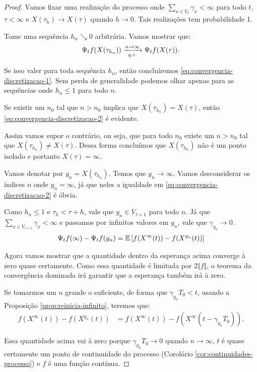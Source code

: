 \begin{proof}
  Vamos fixar uma realização do processo onde $\sum_{x \in V_t}
  \gamma_x < \infty$ para todo $t$, $\tau < \infty$ e $X(\tau_{h}) \to
  X(\tau)$ quando $h \to 0$. Tais realizações tem probabilidade 1.


  Tome uma sequência $h_n \searrow 0$ arbitrária. Vamos mostrar que:
  \begin{equation}
    \label{eq:convergencia-discretizacao-2}
    \Psi_t f (X(\tau_{h_n})) \xrightarrow[{\emph{q.c.}}]{n \to \infty}
    \Psi_t f(X(\tau)).
  \end{equation}

  Se isso valer para toda sequência $h_n$, então concluíremos
  \ref{eq:convergencia-discretizacao-1}. Sem perda de generalidade
  podemos olhar apenas para as sequências onde $h_n \leq 1$ para todo
  $n$.

  Se existir um $n_0$ tal que $n > n_0$ implica que $X(\tau_{h_n}) =
  X(\tau)$, então \eqref{eq:convergencia-discretizacao-2} é evidente.

  Assim vamos supor o contrário, ou seja, que para todo $n_0$ existe
  um $n > n_0$ tal que $X(\tau_{h_n}) \neq X(\tau)$. Dessa forma
  concluímos que $X(\tau_{h_n})$ não é um ponto isolado e portanto
  $X(\tau) = \infty$.

  Vamos denotar por $y_n = X(\tau_{h_n})$. Temos que $y_n \to
  \infty$. Vamos desconsiderar os índices $n$ onde $y_n = \infty$, já
  que neles a igualdade em \eqref{eq:convergencia-discretizacao-2} é
  óbvia.

  Como $h_n \leq 1$ e $\tau_h < \tau + h$, vale que $y_n \in V_{\tau +
    1}$ para todo $n$. Já que $\sum_{x \in V_{\tau + 1}} \gamma_x <
  \infty$ e passamos por infinitos valores em $y_n$, vale que
  $\gamma_{y_n} \to 0$.
  \begin{align*}
    \Psi_t f(\infty) - \Psi_t f (y_n)
    = {\mathbb{E}} \left[
      f(X^{\infty}(t)) - f(X^{y_n}(t))
    \right]
  \end{align*}

  Agora vamos mostrar que a quantidade dentro da esperança acima
  converge à zero quase certamente. Como essa quantidade é limitada
  por $2 \Vert f \Vert$, o teorema da convergência dominada irá
  garantir que a esperança também irá à zero.

  Se tomarmos um $n$ grande o suficiente, de forma que
  $\gamma_{y_n} T_0 < t$, usando a Proposição \ref{prop:reinicia-infinito},
  teremos que:
  \begin{align*}
    f(X^{\infty}(t)) - f(X^{y_n}(t)) &=
    f(X^{\infty}(t)) - f(X^{\infty}(t-\gamma_{y_n} T_0)).
  \end{align*}

  Essa quantidade acima vai à zero porque $\gamma_{y_n} T_0 \to 0$
  quando $n \to \infty$, $t$ é quase certamente um ponto de
  continuidade do processo (Corolário
  \ref{cor:continuidades-processo}) e $f$ é uma função contínua.
\end{proof}



